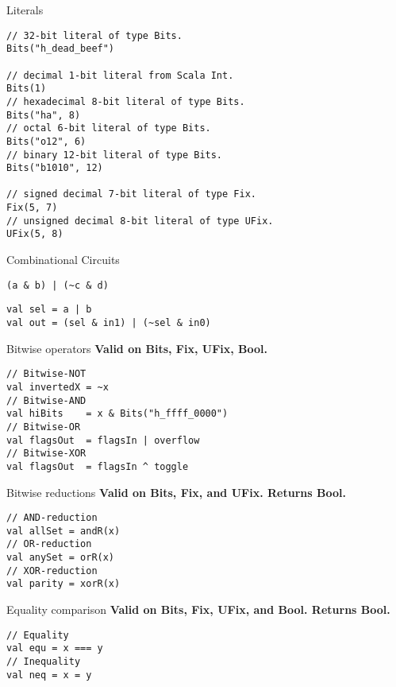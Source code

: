 \documentclass[xcolor=pdflatex,dvipsnames,table]{beamer}
\begin{document}
\begin{frame}[fragile]{Literals}
\begin{lstlisting}
// 32-bit literal of type Bits.
Bits("h_dead_beef") 

// decimal 1-bit literal from Scala Int.
Bits(1)             
// hexadecimal 8-bit literal of type Bits.
Bits("ha", 8)       
// octal 6-bit literal of type Bits.
Bits("o12", 6)      
// binary 12-bit literal of type Bits.
Bits("b1010", 12)   

// signed decimal 7-bit literal of type Fix.
Fix(5, 7)           
// unsigned decimal 8-bit literal of type UFix.
UFix(5, 8)          
\end{lstlisting}
\end{frame}

\begin{frame}[fragile]{Combinational Circuits}
\begin{lstlisting}
(a & b) | (~c & d)
\end{lstlisting}
\begin{lstlisting}
val sel = a | b
val out = (sel & in1) | (~sel & in0)
\end{lstlisting}
\end{frame}

\begin{frame}[fragile]{Bitwise operators}
\textbf{Valid on Bits, Fix, UFix, Bool.}
\begin{lstlisting}
// Bitwise-NOT
val invertedX = ~x                      
// Bitwise-AND 
val hiBits    = x & Bits("h_ffff_0000") 
// Bitwise-OR
val flagsOut  = flagsIn | overflow      
// Bitwise-XOR
val flagsOut  = flagsIn ^ toggle        
\end{lstlisting}
\end{frame}

\begin{frame}[fragile]{Bitwise reductions}
\textbf{Valid on Bits, Fix, and UFix.  Returns Bool.}
\begin{lstlisting}
// AND-reduction 
val allSet = andR(x)  
// OR-reduction
val anySet = orR(x)   
// XOR-reduction 
val parity = xorR(x)  
\end{lstlisting}
\end{frame}

\begin{frame}[fragile]{Equality comparison}
\textbf{Valid on Bits, Fix, UFix, and Bool. Returns Bool.}
\begin{lstlisting}
// Equality
val equ = x === y 
// Inequality 
val neq = x = y   
\end{lstlisting}
\end{frame}
\end{document}
